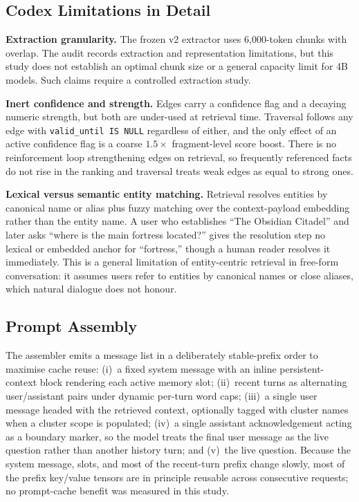 \documentclass[11pt,a4paper]{article}
\begin{document}
\subsection{Codex Limitations in Detail}
\label{app:codex-limits}

\textbf{Extraction granularity.} The frozen v2 extractor uses 6,000-token chunks with overlap. The audit records extraction and representation limitations, but this study does not establish an optimal chunk size or a general capacity limit for 4B models. Such claims require a controlled extraction study.

\textbf{Inert confidence and strength.} Edges carry a confidence flag and a decaying numeric strength, but both are under-used at retrieval time. Traversal follows any edge with \texttt{valid\_until IS NULL} regardless of either, and the only effect of an active confidence flag is a coarse $1.5\times$ fragment-level score boost. There is no reinforcement loop strengthening edges on retrieval, so frequently referenced facts do not rise in the ranking and traversal treats weak edges as equal to strong ones.

\textbf{Lexical versus semantic entity matching.} Retrieval resolves entities by canonical name or alias plus fuzzy matching over the context-payload embedding rather than the entity name. A user who establishes ``The Obsidian Citadel'' and later asks ``where is the main fortress located?'' gives the resolution step no lexical or embedded anchor for ``fortress,'' though a human reader resolves it immediately. This is a general limitation of entity-centric retrieval in free-form conversation: it assumes users refer to entities by canonical names or close aliases, which natural dialogue does not honour.

\subsection{Prompt Assembly}
\label{app:assembly}

The assembler emits a message list in a deliberately stable-prefix order to maximise cache reuse: (i)~a fixed system message with an inline persistent-context block rendering each active memory slot; (ii)~recent turns as alternating user/assistant pairs under dynamic per-turn word caps; (iii)~a single user message headed with the retrieved context, optionally tagged with cluster names when a cluster scope is populated; (iv)~a single assistant acknowledgement acting as a boundary marker, so the model treats the final user message as the live question rather than another history turn; and (v)~the live question. Because the system message, slots, and most of the recent-turn prefix change slowly, most of the prefix key/value tensors are in principle reusable across consecutive requests; no prompt-cache benefit was measured in this study.
\end{document}
